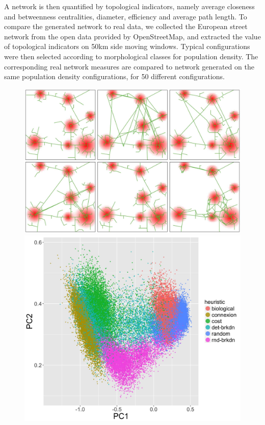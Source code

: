 \documentclass[letterpaper]{article}
\begin{document}
A network is then quantified by topological indicators, namely average closeness and betweenness centralities, diameter, efficiency and average path length. To compare the generated network to real data, we collected the European street network from the open data provided by OpenStreetMap, and extracted the value of topological indicators on 50km side moving windows. Typical configurations were then selected according to morphological classes for population density. The corresponding real network measures are compared to network generated on the same population density configurations, for 50 different configurations.



\begin{figure}[h!]
\vspace{-0.5cm}
\begin{minipage}[c]{0.45\linewidth}
\includegraphics[width=\linewidth]{figures/7-1-2-fig-networkgrowth-examples.jpg}\\
\includegraphics[width=\linewidth]{figures/7-1-2-fig-networkgrowth-feasiblespace.jpg}\\

\end{minipage}
\end{figure}
\end{document}
